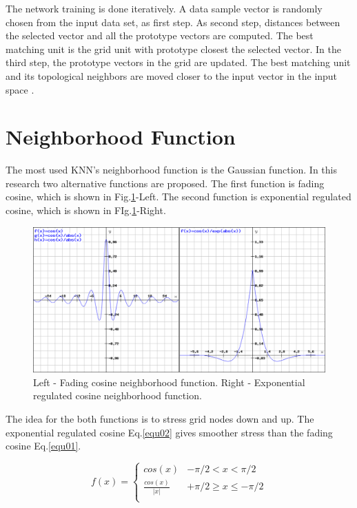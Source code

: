 \documentclass[runningheads]{llncs}
\begin{document}
The network training is done iteratively. A data sample vector is randomly chosen from the input data set, as first step. As second step, distances between the selected vector and all the prototype vectors are computed. The best matching unit is the grid unit with prototype closest the selected vector. In the third step, the prototype vectors in the grid are updated. The best matching unit and its topological neighbors are moved closer to the input vector in the input space \cite{vesanto01,аmerijckx01}.

\section{Neighborhood Function}

The most used KNN's neighborhood function is the Gaussian function. In this research two alternative functions are proposed. The first function is fading cosine, which is shown in Fig.\ref{fig01}-Left. The second function is exponential regulated cosine, which is shown in FIg.\ref{fig01}-Right.

\begin{figure}
\includegraphics[width=1.0\textwidth]{fig01.png}
\centering
\caption{Left - Fading cosine neighborhood function. Right - Exponential regulated cosine neighborhood function.} \label{fig01}
\end{figure}
\FloatBarrier

The idea for the both functions is to stress grid nodes down and up. The exponential regulated cosine Eq.\ref{equ02} gives smoother stress than the fading cosine Eq.\ref{equ01}. 

\begin{equation} \label{equ01}
f(x) = 
	\begin{cases} 
		cos(x) & -\pi/2 < x < \pi/2 \\
		\frac{cos(x)}{|x|} & +\pi/2 \geq x \leq -\pi/2 \\
	\end{cases}
\end{equation}
\end{document}
